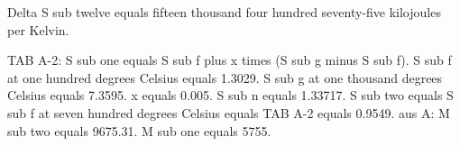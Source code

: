 Delta S sub twelve equals fifteen thousand four hundred seventy-five kilojoules per Kelvin.

TAB A-2:
S sub one equals S sub f plus x times (S sub g minus S sub f).
S sub f at one hundred degrees Celsius equals 1.3029.
S sub g at one thousand degrees Celsius equals 7.3595.
x equals 0.005.
S sub n equals 1.33717.
S sub two equals S sub f at seven hundred degrees Celsius equals TAB A-2 equals 0.9549.
aus A:
M sub two equals 9675.31.
M sub one equals 5755.